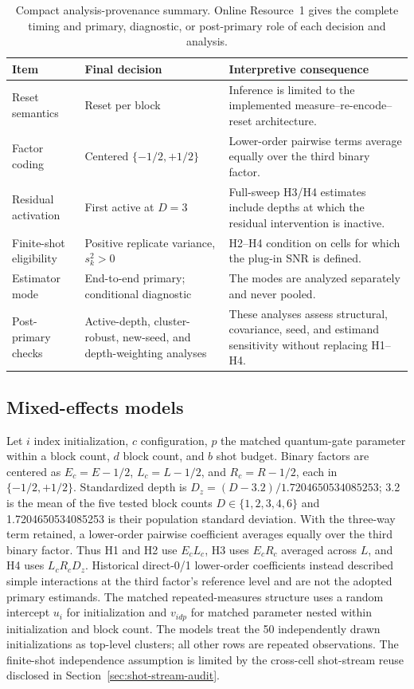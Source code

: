 \documentclass[pdflatex,sn-mathphys-num,Numbered]{sn-jnl}
\begin{document}
\begin{table}[t]
\centering
\small
\begin{tabularx}{\textwidth}{@{}p{}p{}>{\raggedright\arraybackslash}X@{}}
\toprule
Item & Final decision & Interpretive consequence \\
\midrule
Reset semantics & Reset per block & Inference is limited to the implemented measure--re-encode--reset architecture. \\
Factor coding & Centered $\{-1/2,+1/2\}$ & Lower-order pairwise terms average equally over the third binary factor. \\
Residual activation & First active at $D=3$ & Full-sweep H3/H4 estimates include depths at which the residual intervention is inactive. \\
Finite-shot eligibility & Positive replicate variance, $s_k^2>0$ & H2--H4 condition on cells for which the plug-in SNR is defined. \\
Estimator mode & End-to-end primary; conditional diagnostic & The modes are analyzed separately and never pooled. \\
Post-primary checks & Active-depth, cluster-robust, new-seed, and depth-weighting analyses & These analyses assess structural, covariance, seed, and estimand sensitivity without replacing H1--H4. \\
\bottomrule
\end{tabularx}
\caption{Compact analysis-provenance summary. Online Resource~1 gives the complete timing and primary, diagnostic, or post-primary role of each decision and analysis.}
\label{tab:analysis-provenance}
\end{table}

\subsection{Mixed-effects models}

Let $i$ index initialization, $c$ configuration, $p$ the matched quantum-gate parameter within a block count, $d$ block count, and $b$ shot budget. Binary factors are centered as $E_c=E-1/2$, $L_c=L-1/2$, and $R_c=R-1/2$, each in $\{-1/2,+1/2\}$. Standardized depth is $D_z=(D-3.2)/1.7204650534085253$; 3.2 is the mean of the five tested block counts $D\in\{1,2,3,4,6\}$ and 1.7204650534085253 is their population standard deviation. With the three-way term retained, a lower-order pairwise coefficient averages equally over the third binary factor. Thus H1 and H2 use $E_cL_c$, H3 uses $E_cR_c$ averaged across $L$, and H4 uses $L_cR_cD_z$. Historical direct-0/1 lower-order coefficients instead described simple interactions at the third factor's reference level and are not the adopted primary estimands. The matched repeated-measures structure uses a random intercept $u_i$ for initialization and $v_{idp}$ for matched parameter nested within initialization and block count. The models treat the 50 independently drawn initializations as top-level clusters; all other rows are repeated observations. The finite-shot independence assumption is limited by the cross-cell shot-stream reuse disclosed in Section~\ref{sec:shot-stream-audit}.
\end{document}
